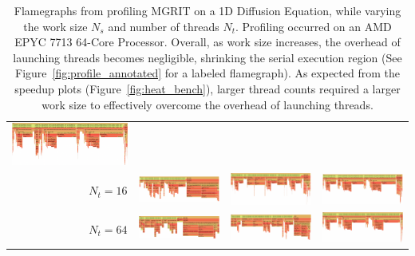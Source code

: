 \documentclass{article}
\begin{document}
\begin{landscape}
\begin{table}
\begin{tabular}[t]{rccc}
                \includegraphics[width=.27\linewidth,valign=t]{docs/assets/profile/ns_20_nt_4.png} \\
            \(N_t = 16\) &
                \includegraphics[width=.27\linewidth,valign=t]{docs/assets/profile/ns_12_nt_16.png} &
                \includegraphics[width=.27\linewidth,valign=t]{docs/assets/profile/ns_16_nt_16.png} &
                \includegraphics[width=.27\linewidth,valign=t]{docs/assets/profile/ns_20_nt_16.png} \\
            \(N_t = 64\) &
                \includegraphics[width=.27\linewidth,valign=t]{docs/assets/profile/ns_12_nt_64.png} &
                \includegraphics[width=.27\linewidth,valign=t]{docs/assets/profile/ns_16_nt_64.png} &
                \includegraphics[width=.27\linewidth,valign=t]{docs/assets/profile/ns_20_nt_64.png} \\
            \bottomrule
        \end{tabular}
        \caption{Flamegraphs from profiling MGRIT on a 1D Diffusion Equation, while varying the work size \(N_s\) and number of threads \(N_t\).
        Profiling occurred on an AMD EPYC 7713 64-Core Processor.
        Overall, as work size increases, the overhead of launching threads becomes negligible, shrinking the serial execution region (See Figure~\ref{fig:profile_annotated} for a labeled flamegraph).
        As expected from the speedup plots (Figure~\ref{fig:heat_bench}), larger thread counts required a larger work size to effectively overcome the overhead of launching threads.
        }
        \label{tab:sweep_profile}
    \end{table}
\end{landscape}
\end{document}
